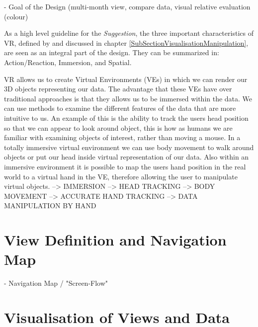 - Goal of the Design (multi-month view, compare data, visual relative evaluation (colour)

As a high level guideline for the \textit{Suggestion}, the three important characteristics of VR, defined by \cite{Stone1994} and discussed in chapter \ref{SubSectionVisualisationManipulation}, are seen as an integral part of the design. They can be summarized in: Action/Reaction, Immersion, and Spatial. \newline




VR allows us to create Virtual Environments (VEs) in which we can render our 3D objects representing our data. The advantage that these VEs have over traditional approaches is that they allows us to be immersed within the data. We can use methods to examine the different features of the data that are more intuitive to us. An example of this is the ability to track the users head position so that we can appear to look around object, this is how as humans we are familiar with examining objects of interest, rather than moving a mouse. In a totally immersive virtual environment we can use body movement to walk around objects or put our head inside virtual representation of our data. Also within an immersive environment it is possible to map the users hand position in the real world to a virtual hand in the VE, therefore allowing the user to manipulate virtual objects.
\cite{Jamieson2007}
--> IMMERSION
--> HEAD TRACKING
--> BODY MOVEMENT
--> ACCURATE HAND TRACKING
--> DATA MANIPULATION BY HAND





\section{View Definition and Navigation Map}


- Navigation Map / "Screen-Flow"



\section{Visualisation of Views and Data}


